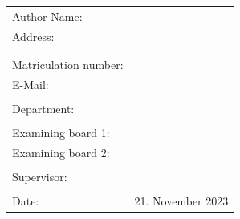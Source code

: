 \begin{titlepage}
	\sffamily

	\begin{figure}%
		\centering
		\qquad
	\end{figure}

	\vspace{2.5cm}

	\begin{center}
		\huge{\thesistitle}

		\vspace{3cm}

		\renewcommand{\baselinestretch}{1.3}
		\Large{\thesistype}

		\large
		\thesistypedesc
	\end{center}

	\vspace{1.5cm}
	\renewcommand{\baselinestretch}{1}
	\begin{table}[htpb]
		\centering
		\begin{tabular}{ll}
			\\
			Author Name: & \thesisauthorname \\
			Address: & \thesisauthorhomestreet \\
			& \thesisauthorhometown \\
			\\
			Matriculation number: & \thesisauthormatrikelnumber \\
			E-Mail: & \thesisauthoremail \\
			\\
			Department: & \thesisdepartment \\
			\\
			Examining board 1: & \thesisfirstreviewer \\
			Examining board 2: & \thesissecondreviewer \\
			\\
			Supervisor: & \thesissupervisor \\
			\\
			Date: & 21. November 2023 \\
		\end{tabular}
	\end{table}

	\rmfamily
\end{titlepage}
